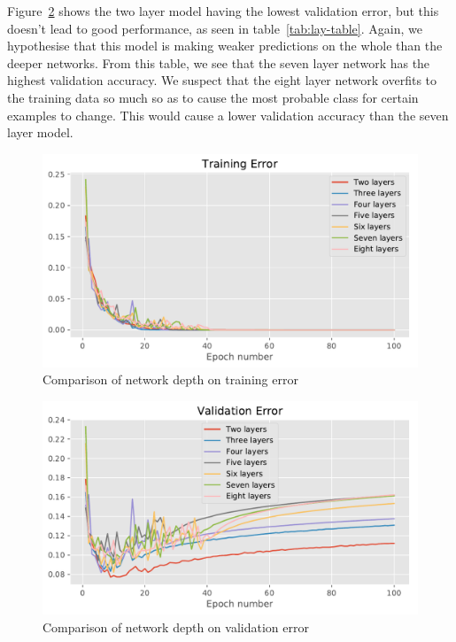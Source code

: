 \documentclass{article}
\begin{document}
Figure~\ref{fig:lay-val-err} shows the two layer model having the lowest validation error, but this doesn't lead to good performance, as seen in table~\ref{tab:lay-table}. Again, we hypothesise that this model is making weaker predictions on the whole than the deeper networks. From this table, we see that the seven layer network has the highest validation accuracy. We suspect that the eight layer network overfits to the training data so much so as to cause the most probable class for certain examples to change. This would cause a lower validation accuracy than the seven layer model. 

\begin{figure}[tb]
\vskip 5mm
\begin{center}
\centerline{\includegraphics[width=\columnwidth]{layers_tr_error}}
\caption{Comparison of network depth on training error}
\label{fig:lay-tr-err}
\end{center}
\vskip -5mm
\end{figure} 

\begin{figure}[tb]
\vskip 5mm
\begin{center}
\centerline{\includegraphics[width=\columnwidth]{layers_error}}
\caption{Comparison of network depth on validation error}
\label{fig:lay-val-err}
\end{center}
\vskip -5mm
\end{figure} 
\end{document}
